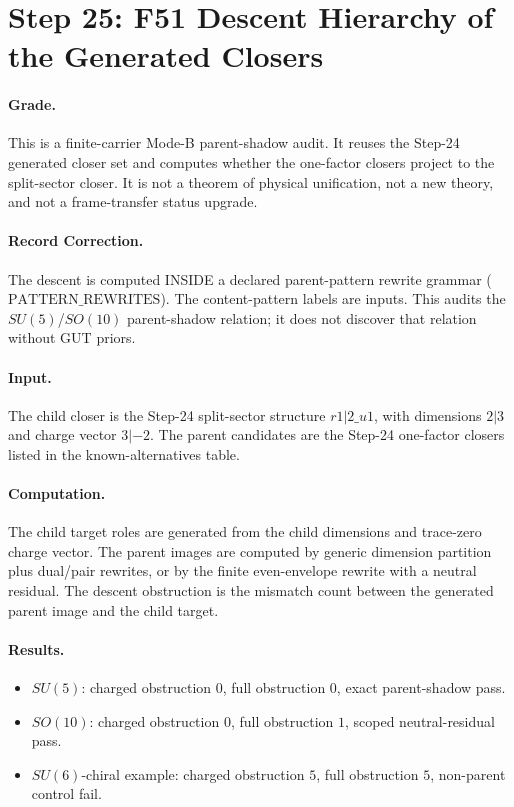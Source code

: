 \section{Step 25: F51 Descent Hierarchy of the Generated Closers}

\paragraph{Grade.}
This is a finite-carrier Mode-B parent-shadow audit. It reuses the Step-24 generated closer set and computes whether the one-factor closers project to the split-sector closer. It is not a theorem of physical unification, not a new theory, and not a frame-transfer status upgrade.

\paragraph{Record Correction.}
The descent is computed INSIDE a declared parent-pattern rewrite grammar (\(\mathrm{PATTERN\_REWRITES}\)). The content-pattern labels are inputs. This audits the \(SU(5)\)/\(SO(10)\) parent-shadow relation; it does not discover that relation without GUT priors.

\paragraph{Input.}
The child closer is the Step-24 split-sector structure \(r1|2\_u1\), with dimensions \(2|3\) and charge vector \(3|-2\). The parent candidates are the Step-24 one-factor closers listed in the known-alternatives table.

\paragraph{Computation.}
The child target roles are generated from the child dimensions and trace-zero charge vector. The parent images are computed by generic dimension partition plus dual/pair rewrites, or by the finite even-envelope rewrite with a neutral residual. The descent obstruction is the mismatch count between the generated parent image and the child target.

\paragraph{Results.}
\begin{itemize}
\item \(SU(5)\): charged obstruction \(0\), full obstruction \(0\), exact parent-shadow pass.
\item \(SO(10)\): charged obstruction \(0\), full obstruction \(1\), scoped neutral-residual pass.
\item \(SU(6)\)-chiral example: charged obstruction \(5\), full obstruction \(5\), non-parent control fail.
\end{itemize}

